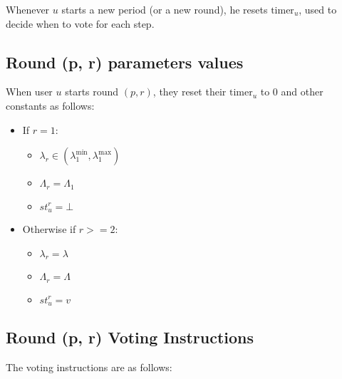 \documentclass{article}
\begin{document}
    Whenever $u$ starts a new period (or a new round), he resets $\text{timer}_u$, used to decide when to vote for each step.

    \subsection{Round (p, r) parameters values}
    When user $u$ starts round $(p, r)$, they reset their $\text{timer}_u$ to 0 and other constants as follows:

    \begin{itemize}
        \item If $r = 1$:
        \begin{itemize}
            \item $\lambda_r \in (\lambda_1^{\text{min}}, \lambda_1^{\text{max}})$
            \item $\Lambda_r = \Lambda_1$
            \item $st^r_u = \bot$
        \end{itemize}

        \item Otherwise if $r >= 2$:
        \begin{itemize}
            \item $\lambda_r = \lambda$
            \item $\Lambda_r = \Lambda$
            \item $st^r_u = v$
        \end{itemize}
    \end{itemize}

    \subsection{Round (p, r) Voting Instructions}
    The voting instructions are as follows:
\end{document}
